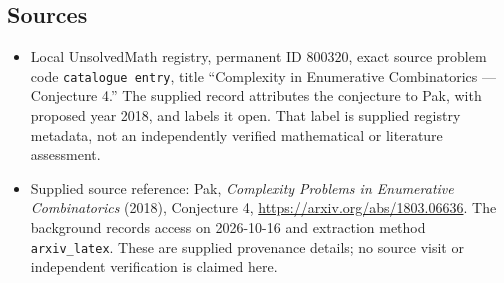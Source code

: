 \documentclass[11pt]{article}
\begin{document}
\subsection{Sources}
\begin{itemize}
\item Local UnsolvedMath registry, permanent ID \(800320\), exact source problem code \texttt{catalogue entry}, title ``Complexity in Enumerative Combinatorics --- Conjecture 4.'' The supplied record attributes the conjecture to Pak, with proposed year 2018, and labels it open. That label is supplied registry metadata, not an independently verified mathematical or literature assessment.
\item Supplied source reference: Pak, \emph{Complexity Problems in Enumerative Combinatorics} (2018), Conjecture 4, \url{https://arxiv.org/abs/1803.06636}. The background records access on 2026-10-16 and extraction method \texttt{arxiv\_latex}. These are supplied provenance details; no source visit or independent verification is claimed here.
\end{itemize}
\end{document}
